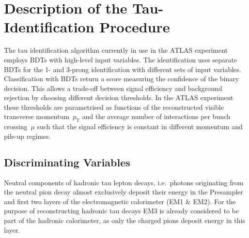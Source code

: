 \section{Description of the Tau-Identification Procedure}
\label{sec:bdt_tauid}
The tau identification algorithm currently in use in the ATLAS experiment
employs BDTs with high-level input variables. The identification uses separate
BDTs for the 1- and 3-prong identification with different sets of input
variables. Classification with BDTs return a score measuring the confidence of
the binary decision. This allows a trade-off between signal efficiency and
background rejection by choosing different decision thresholds. In the ATLAS
experiment these thresholds are parametrised as functions of the reconstructed
visible transverse momentum~$p_\text{T}$ and the average number of interactions
per bunch crossing~$\mu$ such that the signal efficiency is constant in
different momentum and pile-up regimes.

\subsection{Discriminating Variables}
\label{sec:bdt_features}

Neutral components of hadronic tau lepton decays, i.e.\ photons originating from
the neutral pion decay almost exclusively deposit their energy in the Presampler
and first two layers of the electromagnetic calorimeter (EM1 \& EM2). For the
purpose of reconstructing hadronic tau decays EM3 is already considered to be
part of the hadronic calorimeter, as only the charged pions deposit energy in
this layer.

